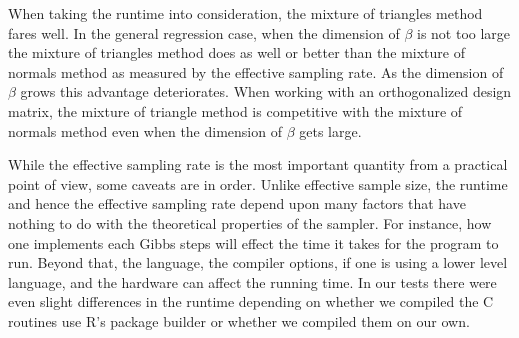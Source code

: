 \documentclass{article}
\begin{document}
When taking the runtime into consideration, the mixture of triangles method
fares well.  In the general regression case, when the dimension of $\beta$ is
not too large the mixture of triangles method does as well or better than the
mixture of normals method as measured by the effective sampling rate.  As the
dimension of $\beta$ grows this advantage deteriorates.  When working with an
orthogonalized design matrix, the mixture of triangle method is competitive with
the mixture of normals method even when the dimension of $\beta$ gets large.

While the effective sampling rate is the most important quantity from a
practical point of view, some caveats are in order.  Unlike effective sample
size, the runtime and hence the effective sampling rate depend upon many factors
that have nothing to do with the theoretical properties of the sampler.  For
instance, how one implements each Gibbs steps will effect the time it takes for
the program to run.  Beyond that, the language, the compiler options, if one is
using a lower level language, and the hardware can affect the running time.  In
our tests there were even slight differences in the runtime depending on whether
we compiled the C routines use R's package builder or whether we compiled them
on our own.


{}

\end{document}
